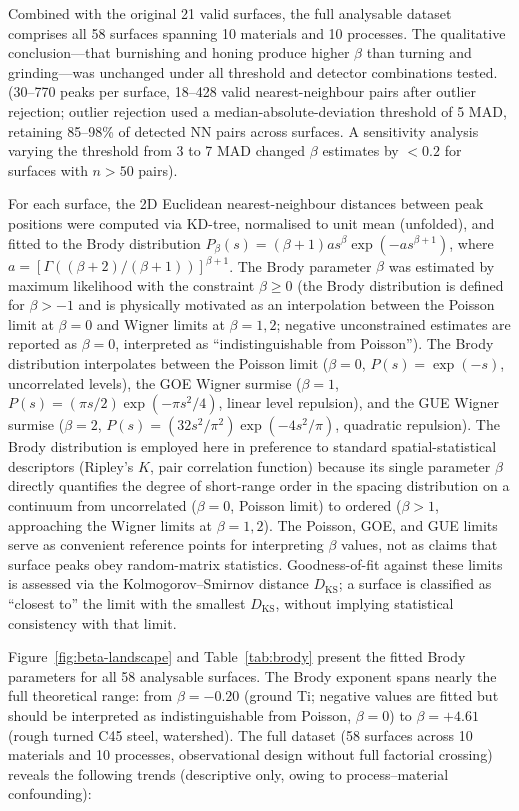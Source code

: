 \documentclass[final,3p,times,twocolumn]{elsarticle}
\theoremstyle{definition}
\begin{document}
Combined with the original 21 valid surfaces, the full analysable
dataset comprises all 58 surfaces spanning 10 materials and 10 processes.
The qualitative conclusion---that burnishing and honing produce higher
$\beta$ than turning and grinding---was unchanged under all threshold
and detector combinations tested.
(30--770 peaks per surface, 18--428 valid nearest-neighbour pairs
after outlier rejection; outlier rejection used a
median-absolute-deviation threshold of 5 MAD, retaining
85--98\% of detected NN pairs across surfaces. A sensitivity
analysis varying the threshold from 3 to 7 MAD changed
$\beta$ estimates by $< 0.2$ for surfaces with $n > 50$ pairs).

For each surface, the 2D Euclidean nearest-neighbour distances
between peak positions were computed via KD-tree, normalised to
unit mean (unfolded), and fitted to the Brody distribution
$P_\beta(s) = (\beta+1) a s^\beta \exp(-a s^{\beta+1})$, where
$a = [\Gamma((\beta+2)/(\beta+1))]^{\beta+1}$. The Brody
parameter $\beta$ was estimated by maximum likelihood with the
constraint $\beta \geq 0$ (the Brody distribution is defined
for $\beta > -1$ and is physically motivated as an interpolation
between the Poisson limit at $\beta=0$ and Wigner limits at
$\beta=1,2$; negative unconstrained estimates are reported as
$\beta = 0$, interpreted as ``indistinguishable from Poisson'').
The Brody distribution interpolates
between the Poisson limit ($\beta=0$, $P(s) = \exp(-s)$,
uncorrelated levels), the GOE Wigner surmise ($\beta=1$,
$P(s) = (\pi s/2) \exp(-\pi s^2/4)$, linear level repulsion),
and the GUE Wigner surmise ($\beta=2$,
$P(s) = (32 s^2/\pi^2) \exp(-4 s^2/\pi)$, quadratic repulsion).
The Brody distribution is employed here in preference to standard
spatial-statistical descriptors (Ripley's $K$, pair correlation
function) because its single parameter $\beta$ directly quantifies
the degree of short-range order in the spacing distribution on a
continuum from uncorrelated ($\beta=0$, Poisson limit) to
ordered ($\beta>1$, approaching the Wigner limits at
$\beta=1,2$). The Poisson, GOE, and GUE limits serve as
convenient reference points for interpreting $\beta$ values,
not as claims that surface peaks obey random-matrix statistics.
Goodness-of-fit against these limits is
assessed via the Kolmogorov--Smirnov distance $D_{\text{KS}}$;
a surface is classified as ``closest to'' the limit with the
smallest $D_{\text{KS}}$, without implying statistical consistency
with that limit.

Figure~\ref{fig:beta-landscape} and Table~\ref{tab:brody} present
the fitted Brody parameters for all 58 analysable surfaces. The Brody
exponent spans nearly the full theoretical range: from
$\beta = -0.20$ (ground Ti; negative values are fitted but
should be interpreted as indistinguishable from Poisson,
$\beta=0$) to
$\beta = +4.61$ (rough turned C45 steel, watershed). The full
dataset (58 surfaces across 10 materials and 10 processes,
observational design without full factorial crossing) reveals
the following trends (descriptive only, owing to process--material
confounding):
\end{document}

